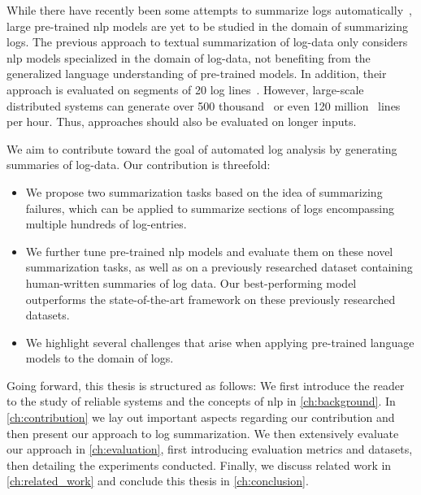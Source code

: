 While there have recently been some attempts to summarize logs automatically~\parencites{log_summary}{logassist},
large pre-trained \ac{nlp} models are yet to be studied in the domain of summarizing logs.
The previous approach to textual summarization of log-data only considers \ac{nlp} models specialized in the domain of log-data,
not benefiting from the generalized language understanding of pre-trained models.
In addition, their approach is evaluated on segments of 20 log lines~\parencites{log_summary}.
However, large-scale distributed systems can generate over 500 thousand~\parencites[126]{hdfs_dataset}[125]{logpai_logparser_benchmarks}
or even 120 million~\parencites[1250]{cloud_diag} lines per hour.
Thus, approaches should also be evaluated on longer inputs.

We aim to contribute toward the goal of automated log analysis by generating summaries of log-data.
Our contribution is threefold:
\begin{itemize}[topsep=0pt,parsep=0pt]
\item We propose two summarization tasks based on the idea of summarizing failures,
      which can be applied to summarize sections of logs encompassing multiple hundreds of log-entries.
\item We further tune pre-trained \ac{nlp} models and evaluate them on these novel summarization tasks,
      as well as on a previously researched dataset containing human-written summaries of log data.
      Our best-performing model outperforms the state-of-the-art framework \parencite{log_summary}
      on these previously researched datasets.
\item We highlight several challenges that arise when applying pre-trained language models to the domain of logs.
\end{itemize}

Going forward, this thesis is structured as follows:
We first introduce the reader to the study of reliable systems and the concepts of \ac{nlp} in \autoref{ch:background}.
In \autoref{ch:contribution} we lay out important aspects regarding our contribution and then present our approach to log summarization.
We then extensively evaluate our approach in \autoref{ch:evaluation}, first introducing evaluation metrics and datasets, then detailing the experiments conducted.
Finally, we discuss related work in \autoref{ch:related_work} and conclude this thesis in \autoref{ch:conclusion}.
